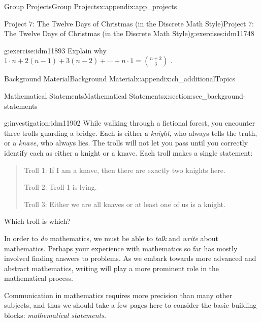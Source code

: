 \documentclass[oneside,10pt,]{book}
\numberwithin{equation}{chapter}
\begin{document}
\begin{appendixptx}{Group Projects}{}{Group Projects}{}{}{x:appendix:app_projects}
\begin{exercises-section-numberless}{Project 7: The Twelve Days of Christmas (in the Discrete Math Style)}{}{Project 7: The Twelve Days of Christmas (in the Discrete Math Style)}{}{}{g:exercises:idm11748}
\begin{divisionexercise}{6}{}{}{g:exercise:idm11893}%
Explain why \(1 \cdot n + 2\left( n - 1 \right) + 3\left( n - 2 \right) + \cdots + n \cdot 1 =
\binom{n + 2}{3}\) .%
\end{divisionexercise}%
\end{exercises-section-numberless}
\end{appendixptx}
%
%
\typeout{************************************************}
\typeout{************************************************}
%
\begin{appendixptx}{Background Material}{}{Background Material}{}{}{x:appendix:ch_additionalTopics}
%
%
\typeout{************************************************}
\typeout{************************************************}
%
\begin{sectionptx}{Mathematical Statements}{}{Mathematical Statements}{}{}{x:section:sec_background-statements}
\begin{introduction}{}%
\begin{investigation}{}{g:investigation:idm11902}%
While walking through a fictional forest, you encounter three trolls guarding a bridge. Each is either a \emph{knight}, who always tells the truth, or a \emph{knave}, who always lies. The trolls will not let you pass until you correctly identify each as either a knight or a knave. Each troll makes a single statement:%
\begin{quote}%
Troll 1: If I am a knave, then there are exactly two knights here.%
\par
Troll 2: Troll 1 is lying.%
\par
Troll 3: Either we are all knaves or at least one of us is a knight.%
\end{quote}
Which troll is which?  %
\end{investigation}
In order to \emph{do} mathematics, we must be able to \emph{talk} and \emph{write} about mathematics. Perhaps your experience with mathematics so far has mostly involved finding answers to problems. As we embark towards more advanced and abstract mathematics, writing will play a more prominent role in the mathematical process.%
\par
Communication in mathematics requires more precision than many other subjects, and thus we should take a few pages here to consider the basic building blocks: \emph{mathematical statements}.%

\end{introduction}
\end{sectionptx}
\end{appendixptx}
\end{document}
